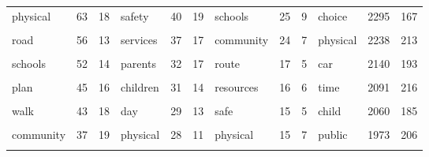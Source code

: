 \documentclass[preprint, 3p,
authoryear]{elsarticle} %
\begin{document}
\begin{table}
{\begin{tabular}[t]{lcclcclcclcc}
physical & 63 & 18 & safety & 40 & 19 & schools & 25 & 9 & choice & 2295 & 167\\
\cellcolor{gray!6}{traffic} & \cellcolor{gray!6}{59} & \cellcolor{gray!6}{20} & \cellcolor{gray!6}{safe} & \cellcolor{gray!6}{39} & \cellcolor{gray!6}{19} & \cellcolor{gray!6}{children} & \cellcolor{gray!6}{25} & \cellcolor{gray!6}{6} & \cellcolor{gray!6}{activity} & \cellcolor{gray!6}{2265} & \cellcolor{gray!6}{207}\\
road & 56 & 13 & services & 37 & 17 & community & 24 & 7 & physical & 2238 & 213\\
\addlinespace
\cellcolor{gray!6}{activity} & \cellcolor{gray!6}{55} & \cellcolor{gray!6}{14} & \cellcolor{gray!6}{planning} & \cellcolor{gray!6}{37} & \cellcolor{gray!6}{7} & \cellcolor{gray!6}{bus} & \cellcolor{gray!6}{18} & \cellcolor{gray!6}{4} & \cellcolor{gray!6}{trips} & \cellcolor{gray!6}{2164} & \cellcolor{gray!6}{168}\\
schools & 52 & 14 & parents & 32 & 17 & route & 17 & 5 & car & 2140 & 193\\
\cellcolor{gray!6}{children} & \cellcolor{gray!6}{47} & \cellcolor{gray!6}{15} & \cellcolor{gray!6}{sustainable} & \cellcolor{gray!6}{31} & \cellcolor{gray!6}{8} & \cellcolor{gray!6}{zone} & \cellcolor{gray!6}{16} & \cellcolor{gray!6}{6} & \cellcolor{gray!6}{safety} & \cellcolor{gray!6}{2111} & \cellcolor{gray!6}{202}\\
plan & 45 & 16 & children & 31 & 14 & resources & 16 & 6 & time & 2091 & 216\\
\cellcolor{gray!6}{students} & \cellcolor{gray!6}{44} & \cellcolor{gray!6}{14} & \cellcolor{gray!6}{child} & \cellcolor{gray!6}{31} & \cellcolor{gray!6}{12} & \cellcolor{gray!6}{day} & \cellcolor{gray!6}{16} & \cellcolor{gray!6}{4} & \cellcolor{gray!6}{factors} & \cellcolor{gray!6}{2083} & \cellcolor{gray!6}{214}\\
\addlinespace
walk & 43 & 18 & day & 29 & 13 & safe & 15 & 5 & child & 2060 & 185\\
\cellcolor{gray!6}{public} & \cellcolor{gray!6}{39} & \cellcolor{gray!6}{15} & \cellcolor{gray!6}{routes} & \cellcolor{gray!6}{28} & \cellcolor{gray!6}{14} & \cellcolor{gray!6}{planning} & \cellcolor{gray!6}{15} & \cellcolor{gray!6}{4} & \cellcolor{gray!6}{walk} & \cellcolor{gray!6}{1985} & \cellcolor{gray!6}{198}\\
community & 37 & 19 & physical & 28 & 11 & physical & 15 & 7 & public & 1973 & 206\\
\cellcolor{gray!6}{safe} & \cellcolor{gray!6}{34} & \cellcolor{gray!6}{16} & \cellcolor{gray!6}{health} & \cellcolor{gray!6}{28} & \cellcolor{gray!6}{11} & \cellcolor{gray!6}{healthy} & \cellcolor{gray!6}{14} & \cellcolor{gray!6}{6} & \cellcolor{gray!6}{age} & \cellcolor{gray!6}{1774} & \cellcolor{gray!6}{209}\\

\end{tabular}}
\end{table}
\end{document}
